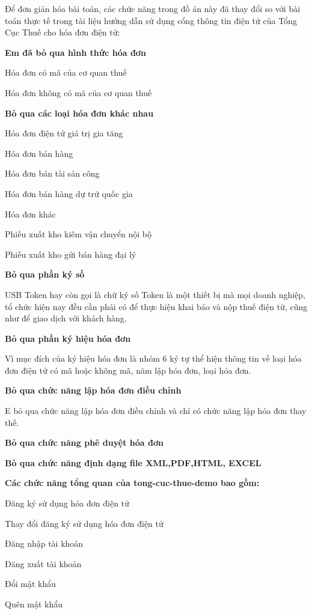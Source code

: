 Để đơn giản hóa bài toán, các chức năng trong đồ án này đã thay đổi so với bài toán thực tế trong tài liệu hướng dẫn sử dụng cổng thông tin điện tử của Tổng Cục Thuế cho hóa đơn điện tử:

\textbf{Em đã bỏ qua hình thức hóa đơn}

Hóa đơn có mã của cơ quan thuế

Hóa đơn không có mã của cơ quan thuế

\textbf{Bỏ qua các loại hóa đơn khác nhau}

Hóa đơn điện tử giá trị gia tăng

Hóa đơn bán hàng

Hóa đơn bán tài sản công

Hóa đơn bán hàng dự trữ quốc gia

Hóa đơn khác

Phiếu xuất kho kiêm vận chuyển nội bộ

Phiếu xuất kho gửi bán hàng đại lý

\textbf{Bỏ qua phần ký số}

USB Token hay còn gọi là chữ ký số Token là một thiết bị mà mọi doanh nghiệp, tổ chức hiện nay đều cần phải có để thực hiện khai báo và nộp thuế điện tử, cũng như để giao dịch với khách hàng.

\textbf{Bỏ qua phần ký hiệu hóa đơn}

Vì mục đích của ký hiệu hóa đơn là nhóm 6 ký tự thể hiện thông tin về loại hóa đơn điện tử có mã hoặc không mã, năm lập hóa đơn, loại hóa đơn.

\textbf{Bỏ qua chức năng lập hóa đơn điều chỉnh}

E bỏ qua chức năng lập hóa đơn điều chỉnh và chỉ có chức năng lập hóa đơn thay thế.

\textbf{Bỏ qua chức năng phê duyệt hóa đơn}

\textbf{Bỏ qua chức năng định dạng file XML,PDF,HTML, EXCEL}

\textbf{Các chức năng tổng quan của tong-cuc-thue-demo bao gồm:}


Đăng ký sử dụng hóa đơn điện tử

Thay đổi đăng ký sử dụng hóa đơn điện tử

Đăng nhập tài khoản

Đăng xuất tài khoản

Đổi mật khẩu

Quên mật khẩu


